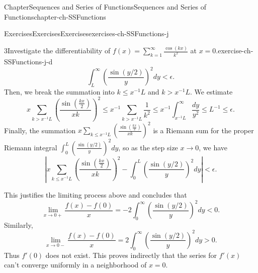 \documentclass[oneside,10pt,]{book}
\numberwithin{equation}{section}
\begin{document}
\begin{chapterptx}{Chapter}{Sequences and Series of Functions}{}{Sequences and Series of Functions}{}{}{chapter-ch-SSFunctions}
\begin{exercises-section}{Exercises}{Exercises}{}{Exercises}{}{}{exercises-ch-SSFunctions-j}
\begin{divisionexercise}{3}{Investigate the differentiability of \(f(x)=\sum_{k=1}^{\infty}\frac{\cos(kx)}{k^2}\) at \(x=0\).}{}{exercise-ch-SSFunctions-j-d}
\begin{equation*}
\int_{L} ^{\infty}  \left(  \frac{ \sin (y/2) }{y} \right)^2 dy < \epsilon.
\end{equation*}
Then, we break the summation into \(k \le x^{-1}L\) and \(k > x^{-1}L\). We estimate%
\begin{equation*}
x \sum_{k> x^{-1}L} \left(  \frac{ \sin (\frac{kx}{2})}{xk}\right)^2 
\le x^{-1} \sum_{k> x^{-1}L} \frac{1}{k^{2}} \le x^{-1} \int_{x^{-1}L}^{\infty} \frac{dy}{y^{2}}
\le L^{-1} \le \epsilon.
\end{equation*}
Finally, the summation \(x \sum_{k\le x^{-1}L } \left(  \frac{ \sin (\frac{kx}{2})}{xk}\right)^2\) is a Riemann sum for the proper Riemann integral \(\int_0^{L}  \left(  \frac{ \sin (y/2) }{y} \right)^2 dy\), so as the step size \(x\to 0\), we have%
\begin{equation*}
\left| x \sum_{k\le x^{-1}L } \left(  \frac{ \sin (\frac{kx}{2})}{xk}\right)^2- 
\int_0^{L}  \left(  \frac{ \sin (y/2) }{y} \right)^2 dy \right| < \epsilon.
\end{equation*}
%
\par
This justifies the limiting process above and concludes that%
\begin{equation*}
\lim_{x\to 0+}  \frac{f(x)-f(0)}{x} = - 2  \int_0^{\infty}  \left(  \frac{ \sin (y/2) }{y} \right)^2 dy  < 0.
\end{equation*}
Similarly,%
\begin{equation*}
\lim_{x\to 0-}  \frac{f(x)-f(0)}{x} =  2  \int_0^{\infty}  \left(  \frac{ \sin (y/2) }{y} \right)^2 dy  > 0.
\end{equation*}
Thus \(f'(0)\) does not exist. This proves indirectly that the series for \(f'(x)\) can't converge uniformly in a neighborhood of \(x=0\).%
\end{divisionexercise}%
\end{exercises-section}
\end{chapterptx}
%
%
\typeout{************************************************}
\typeout{************************************************}
%
\end{document}

